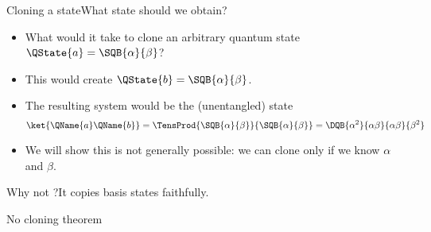 \begin{frame}{Cloning a state}{What state should we obtain?}

\begin{itemize}
    \item<1-> What would it take to clone an arbitrary quantum state 
    $\QState{a}=\SQB{\alpha}{\beta}$?
    \item<2-> This would create $\QState{b}=\SQB{\alpha}{\beta}$.
    \item<3-> The resulting system would be the (unentangled)
    state 
    \[
     \ket{\QName{a}\QName{b}} = \TensProd{\SQB{\alpha}{\beta}}{\SQB{\alpha}{\beta}} = \DQB{\alpha^{2}}{\alpha\beta}{\alpha\beta}{\beta^{2}}
    \]
    \item<4> We will show this is not generally possible:  we can clone  only if we know $\alpha$ and $\beta$.
\end{itemize}

\end{frame}

\begin{frame}{Why not ?}{It copies basis states faithfully.}

    
\end{frame}

\begin{frame}{No cloning theorem}

    
\end{frame}